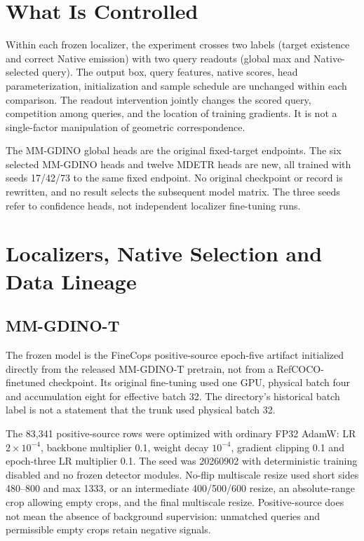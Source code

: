 \documentclass[10pt,twocolumn,letterpaper]{article}
\begin{document}



\section{What Is Controlled}
Within each frozen localizer, the experiment crosses two labels
(target existence and correct Native emission) with two query readouts
(global max and Native-selected query). The output box, query features,
native scores, head parameterization, initialization and sample schedule
are unchanged within each comparison.
The readout intervention jointly changes the scored query, competition
among queries, and the location of training gradients. It is not a
single-factor manipulation of geometric correspondence.

The MM-GDINO global heads are the original fixed-target endpoints.
The six selected MM-GDINO heads and twelve MDETR heads are new, all
trained with seeds 17/42/73 to the same fixed endpoint. No original
checkpoint or record is rewritten, and no result selects the subsequent
model matrix. The three seeds refer to confidence heads, not independent
localizer fine-tuning runs.

\section{Localizers, Native Selection and Data Lineage}
\subsection{MM-GDINO-T}
The frozen model is the FineCops positive-source epoch-five artifact
initialized directly from the released MM-GDINO-T pretrain, not from a
RefCOCO-finetuned checkpoint. Its original fine-tuning used one GPU,
physical batch four and accumulation eight for effective batch 32.
The directory's historical batch label is not a statement that the
trunk used physical batch 32.

The 83,341 positive-source rows were optimized with ordinary FP32 AdamW:
LR $2\times10^{-4}$, backbone multiplier 0.1, weight decay $10^{-4}$,
gradient clipping 0.1 and epoch-three LR multiplier 0.1. The seed was
20260902 with deterministic training disabled and no frozen detector
modules. No-flip multiscale resize used short sides 480--800 and max 1333,
or an intermediate 400/500/600 resize, an absolute-range crop allowing
empty crops, and the final multiscale resize.
Positive-source does not mean the absence of background supervision:
unmatched queries and permissible empty crops retain negative signals.
\end{document}
